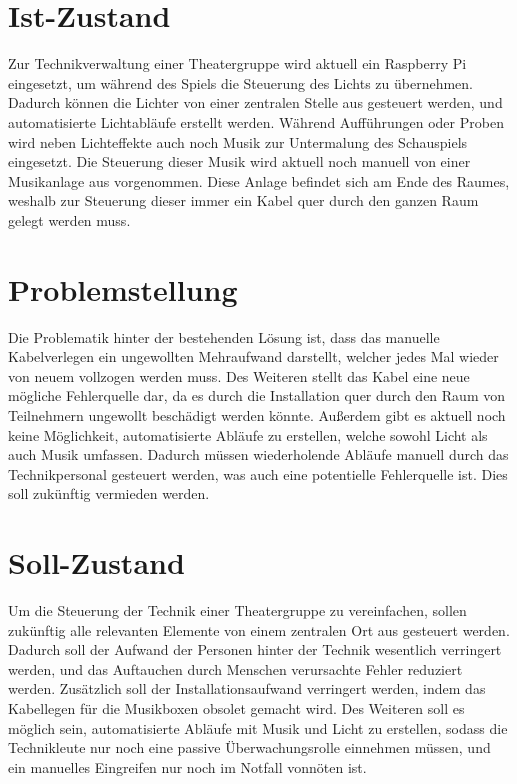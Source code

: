 

\section{Ist-Zustand}
Zur Technikverwaltung einer Theatergruppe wird aktuell ein Raspberry
Pi eingesetzt, um während des Spiels die Steuerung des Lichts zu übernehmen. Dadurch
können die Lichter von einer zentralen Stelle aus gesteuert werden,
und automatisierte Lichtabläufe erstellt werden. Während Aufführungen oder
Proben wird neben Lichteffekte auch noch Musik zur Untermalung des
Schauspiels eingesetzt. Die Steuerung dieser Musik wird aktuell noch manuell von
einer Musikanlage aus vorgenommen. Diese Anlage befindet sich am Ende des
Raumes, weshalb zur Steuerung dieser immer ein Kabel quer durch den ganzen
Raum gelegt werden muss.

\section{Problemstellung}
Die Problematik hinter der bestehenden Lösung ist, dass das manuelle Kabelverlegen
ein ungewollten Mehraufwand darstellt, welcher jedes Mal wieder von neuem
vollzogen werden muss. Des Weiteren stellt das Kabel eine neue mögliche
Fehlerquelle dar, da es durch die Installation quer durch den Raum von
Teilnehmern ungewollt beschädigt werden könnte.
Außerdem gibt es aktuell noch keine Möglichkeit, automatisierte
Abläufe zu erstellen, welche sowohl Licht als auch Musik umfassen. Dadurch
müssen wiederholende Abläufe manuell durch das Technikpersonal gesteuert
werden, was auch eine potentielle Fehlerquelle ist. Dies soll zukünftig
vermieden werden.


\section{Soll-Zustand}
Um die Steuerung der Technik einer Theatergruppe zu vereinfachen, sollen
zukünftig alle relevanten Elemente von einem zentralen Ort aus gesteuert
werden. Dadurch soll der Aufwand der Personen hinter der Technik wesentlich
verringert werden, und das Auftauchen durch Menschen verursachte Fehler
reduziert werden. Zusätzlich soll der Installationsaufwand verringert werden,
indem das Kabellegen für die Musikboxen obsolet gemacht wird.  Des Weiteren
soll es möglich sein, automatisierte Abläufe mit Musik und Licht zu erstellen,
sodass die Technikleute nur noch eine passive Überwachungsrolle einnehmen
müssen, und ein manuelles Eingreifen nur noch im Notfall vonnöten ist. 


